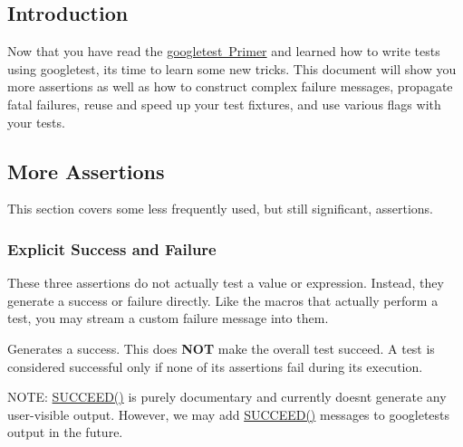 \subsection*{Introduction}

Now that you have read the \mbox{\hyperlink{primer_8md}{googletest Primer}} and learned how to write tests using googletest, it\textquotesingle{}s time to learn some new tricks. This document will show you more assertions as well as how to construct complex failure messages, propagate fatal failures, reuse and speed up your test fixtures, and use various flags with your tests.

\subsection*{More Assertions}

This section covers some less frequently used, but still significant, assertions.

\subsubsection*{Explicit Success and Failure}

These three assertions do not actually test a value or expression. Instead, they generate a success or failure directly. Like the macros that actually perform a test, you may stream a custom failure message into them.


\begin{DoxyCode}{0}
\end{DoxyCode}


Generates a success. This does {\bfseries{N\+OT}} make the overall test succeed. A test is considered successful only if none of its assertions fail during its execution.

N\+O\+TE\+: {\ttfamily \mbox{\hyperlink{gtest_8h_a75adcdf89f69b0b615e395daafc315af}{S\+U\+C\+C\+E\+E\+D()}}} is purely documentary and currently doesn\textquotesingle{}t generate any user-\/visible output. However, we may add {\ttfamily \mbox{\hyperlink{gtest_8h_a75adcdf89f69b0b615e395daafc315af}{S\+U\+C\+C\+E\+E\+D()}}} messages to googletest\textquotesingle{}s output in the future.


\begin{DoxyCode}{0}
\end{DoxyCode}


